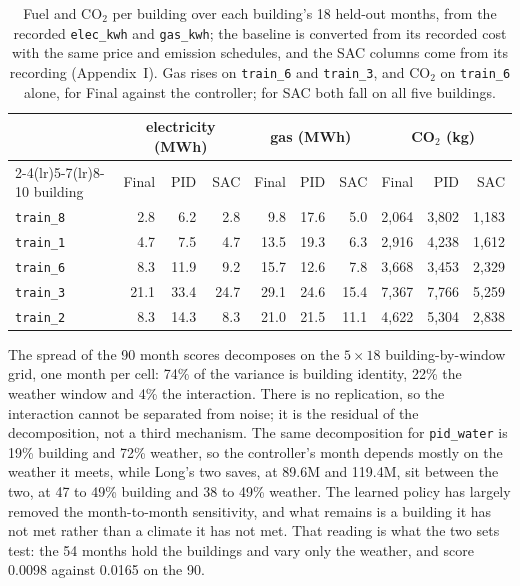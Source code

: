 \documentclass{article}
\begin{document}
\begin{table}[h!]
\centering
\small
\begin{tabular}{@{}lrrrrrrrrr@{}}
\toprule
 & \multicolumn{3}{c}{electricity (MWh)} & \multicolumn{3}{c}{gas (MWh)} & \multicolumn{3}{c}{CO$_2$ (kg)} \\
\cmidrule(lr){2-4}\cmidrule(lr){5-7}\cmidrule(lr){8-10}
building & Final & PID & SAC & Final & PID & SAC & Final & PID & SAC \\
\midrule
\texttt{train\_8} & 2.8 & 6.2 & 2.8 & 9.8 & 17.6 & 5.0 & 2{,}064 & 3{,}802 & 1{,}183 \\
\texttt{train\_1} & 4.7 & 7.5 & 4.7 & 13.5 & 19.3 & 6.3 & 2{,}916 & 4{,}238 & 1{,}612 \\
\texttt{train\_6} & 8.3 & 11.9 & 9.2 & 15.7 & 12.6 & 7.8 & 3{,}668 & 3{,}453 & 2{,}329 \\
\texttt{train\_3} & 21.1 & 33.4 & 24.7 & 29.1 & 24.6 & 15.4 & 7{,}367 & 7{,}766 & 5{,}259 \\
\texttt{train\_2} & 8.3 & 14.3 & 8.3 & 21.0 & 21.5 & 11.1 & 4{,}622 & 5{,}304 & 2{,}838 \\
\bottomrule
\end{tabular}
\vspace{4pt}
\caption{Fuel and CO$_2$ per building over each building's 18 held-out months, from the recorded \texttt{elec\_kwh} and \texttt{gas\_kwh}; the baseline is converted from its recorded cost with the same price and emission schedules, and the SAC columns come from its recording (Appendix~I). Gas rises on \texttt{train\_6} and \texttt{train\_3}, and CO$_2$ on \texttt{train\_6} alone, for Final against the controller; for SAC both fall on all five buildings.}
\label{tab:app_fuel}
\end{table}

The spread of the 90 month scores decomposes on the $5\times18$ building-by-window grid, one month per cell: 74\% of the variance is building identity, 22\% the weather window and 4\% the interaction. There is no replication, so the interaction cannot be separated from noise; it is the residual of the decomposition, not a third mechanism. The same decomposition for \texttt{pid\_water} is 19\% building and 72\% weather, so the controller's month depends mostly on the weather it meets, while Long's two saves, at 89.6M and 119.4M, sit between the two, at 47 to 49\% building and 38 to 49\% weather. The learned policy has largely removed the month-to-month sensitivity, and what remains is a building it has not met rather than a climate it has not met. That reading is what the two sets test: the 54 months hold the buildings and vary only the weather, and score 0.0098 against 0.0165 on the 90.
\end{document}
